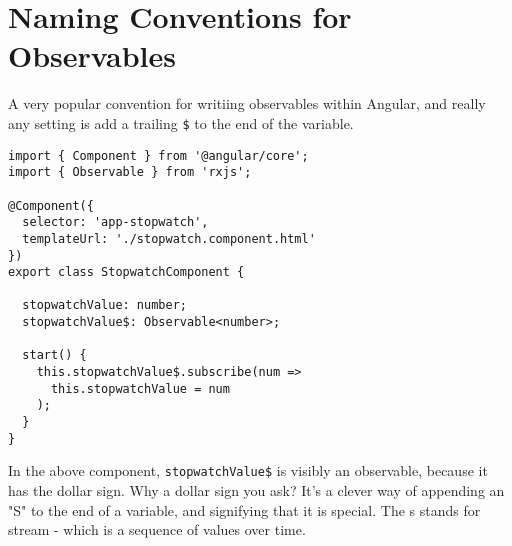 \section{ Naming Conventions for Observables }
A very popular convention for writiing observables within Angular, and really
any setting is add a trailing \lstinline{$} to the end of the variable. 
\begin{lstlisting}
import { Component } from '@angular/core';
import { Observable } from 'rxjs';

@Component({
  selector: 'app-stopwatch',
  templateUrl: './stopwatch.component.html'
})
export class StopwatchComponent {

  stopwatchValue: number;
  stopwatchValue$: Observable<number>;

  start() {
    this.stopwatchValue$.subscribe(num =>
      this.stopwatchValue = num
    );
  }
}  
\end{lstlisting}

In the above component, \lstinline{stopwatchValue$} is visibly an observable,
because it has the dollar sign. Why a dollar sign you ask? It's a clever way 
of appending an "S" to the end of a variable, and signifying that it is 
special. The s stands for stream - which is a sequence of values over time.



